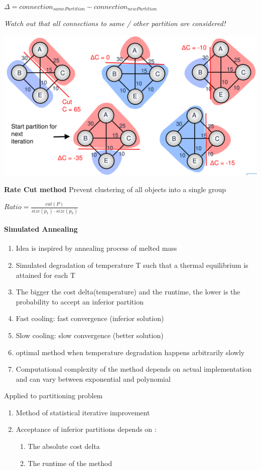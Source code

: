 \documentclass[english]{latex4ei/latex4ei_sheet}
\begin{document}
$\Delta = connection_{samePartition} - connection_{newPartition}$ 

\textit{Watch out that all connections to same / other partition are considered!}

\begin{center}
  \includegraphics[width=0.8\linewidth]{assets/MinCut.png}
  \label{fig:mincut}
\end{center}

\textbf{Rate Cut method} Prevent clustering of all objects into a single group

$Ratio = \frac{cut(P)}{size(p_1) \cdot size(p_2)}$

\paragraph{Simulated Annealing}
\begin{enumerate}
	\item Idea is inspired by annealing process of melted mass
	\item Simulated degradation of temperature T such that a thermal equilibrium is attained for each T
	\item The bigger the cost delta(temperature) and the runtime, the lower is the probability to accept an inferior partition
	\item Fast cooling: fast convergence (inferior solution)
	\item Slow cooling: slow convergence (better solution)
	\item optimal method when temperature degradation happens arbitrarily slowly
	\item Computational complexity of the method depends on actual implementation and can vary between exponential and polynomial
\end{enumerate}


Applied to partitioning problem
\begin{enumerate}
	\item  Method of statistical iterative improvement 
	\item Acceptance of inferior partitions depends on :
	  \begin{enumerate}
	  	\item The absolute cost delta
		\item The runtime of the method
	  \end{enumerate}
\end{enumerate}
\end{document}
